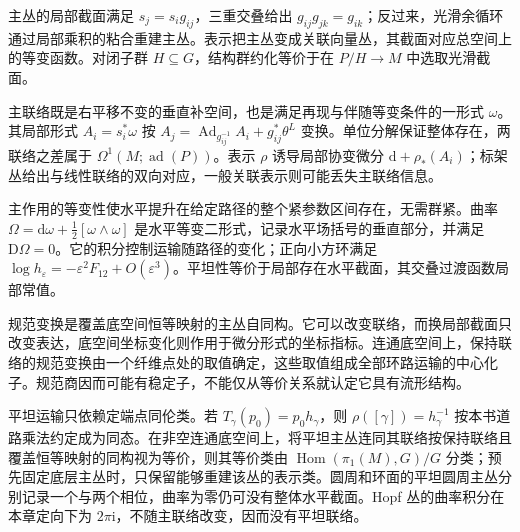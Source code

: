 \begin{chaptersummary}
	主丛的局部截面满足 \(s_j=s_i g_{ij}\)，三重交叠给出 \(g_{ij}g_{jk}=g_{ik}\)；反过来，光滑余循环通过局部乘积的粘合重建主丛。表示把主丛变成关联向量丛，其截面对应总空间上的等变函数。对闭子群 \(H\subseteq G\)，结构群约化等价于在 \(P/H\to M\) 中选取光滑截面。

	\ProseParagraphBreak

	主联络既是右平移不变的垂直补空间，也是满足再现与伴随等变条件的一形式 \(\omega\)。其局部形式 \(A_i=s_i^*\omega\) 按 \(A_j=\operatorname{Ad}_{g_{ij}^{-1}}A_i+g_{ij}^*\theta^L\) 变换。单位分解保证整体存在，两联络之差属于 \(\Omega^1(M;\operatorname{ad}(P))\)。表示 \(\rho\) 诱导局部协变微分 \(\mathrm{d}+\rho_*(A_i)\)；标架丛给出与线性联络的双向对应，一般关联表示则可能丢失主联络信息。

	\ProseParagraphBreak

	主作用的等变性使水平提升在给定路径的整个紧参数区间存在，无需群紧。曲率 \(\Omega=\mathrm{d}\omega+\tfrac12[\omega\wedge\omega]\) 是水平等变二形式，记录水平场括号的垂直部分，并满足 \(\mathrm{D}\Omega=0\)。它的积分控制运输随路径的变化；正向小方环满足 \(\log h_\varepsilon=-\varepsilon^2F_{12}+O(\varepsilon^3)\)。平坦性等价于局部存在水平截面，其交叠过渡函数局部常值。

	\ProseParagraphBreak

	规范变换是覆盖底空间恒等映射的主丛自同构。它可以改变联络，而换局部截面只改变表达，底空间坐标变化则作用于微分形式的坐标指标。连通底空间上，保持联络的规范变换由一个纤维点处的取值确定，这些取值组成全部环路运输的中心化子。规范商因而可能有稳定子，不能仅从等价关系就认定它具有流形结构。

	\ProseParagraphBreak

	平坦运输只依赖定端点同伦类。若 \(T_\gamma(p_0)=p_0h_\gamma\)，则 \(\rho([\gamma])=h_\gamma^{-1}\) 按本书道路乘法约定成为同态。在非空连通底空间上，将平坦主丛连同其联络按保持联络且覆盖恒等映射的同构视为等价，则其等价类由 \(\operatorname{Hom}(\pi_1(M),G)/G\) 分类；预先固定底层主丛时，只保留能够重建该丛的表示类。圆周和环面的平坦圆周主丛分别记录一个与两个相位，曲率为零仍可没有整体水平截面。Hopf 丛的曲率积分在本章定向下为 \(2\pi\mathrm{i}\)，不随主联络改变，因而没有平坦联络。
\end{chaptersummary}

\BookExercises

